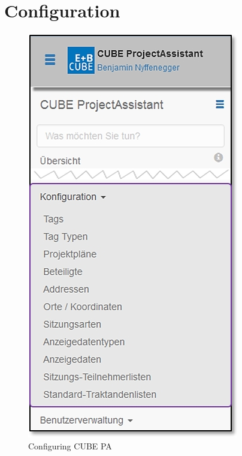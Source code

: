 
\clearpage
\section{Configuration}

\begin{figure}   %
  \vspace{-35pt}      %
  \begin{center}
    \includegraphics[width=1\linewidth]{../chapters/13_Konfigurationen/pictures/13_Menu_Konfiguration.jpg}
  \end{center}
  \vspace{-20pt}
  \caption{Configuring CUBE PA}
  \vspace{-10pt}
\end{figure}

